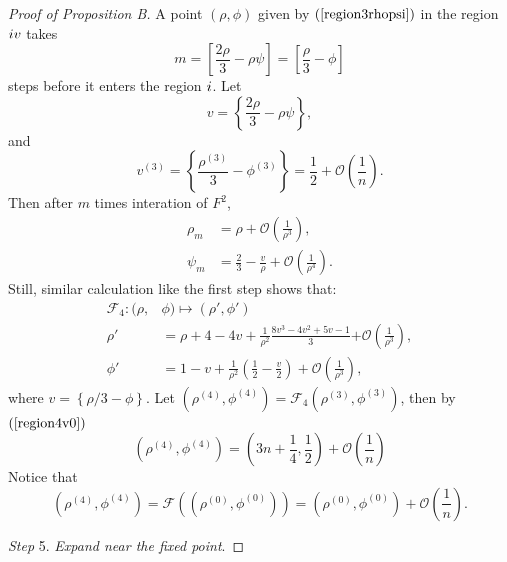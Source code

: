 \documentclass{article}
\def \Rone{\uppercase\expandafter{\romannumeral1}}
\def \Rfour{\uppercase\expandafter{\romannumeral4}}
\numberwithin{figure}{section}
\numberwithin{equation}{section}
\theoremstyle{remark}
\theoremstyle{definition}
\begin{document}
\begin{proof}[Proof of Proposition B]
       A point $(\rho,\phi)$ given by $(\ref{region3rhopsi})$ in the region $\Rfour$ takes 
       $$m=\left[\frac{2\rho}{3}-\rho\psi\right]=\left[\frac{\rho}{3}-\phi\right]$$
       steps before it enters the region $\Rone$. Let
       $$v=\left\{\frac{2\rho}{3}-\rho\psi\right\},$$
    and
    \begin{equation}\label{region4v0}
         v^{(3)}=\left\{\frac{\rho^{(3)}}{3}-\phi^{(3)}\right\}=\frac{1}{2}+\mathcal{O}\left(\frac{1}{n}\right).
    \end{equation}
    Then after $m$ times interation of $F^2$,
       \begin{equation}\label{cross4}
		\begin{split}
			\rho_{m} &= \rho + \mathcal{O}\left( \frac{1}{\rho^{3}} \right),\\
			\psi_{m} &= \frac{2}{3} - \frac{v}{\rho} + \mathcal{O}\left( \frac{1}{\rho^{4}} \right).
		\end{split}
	\end{equation}
       Still, similar calculation like the first step shows that:
       \begin{equation}\label{F4}
		\begin{split}
        \mathcal{F}_4:(\rho,&\phi)\mapsto(\rho',\phi')\\
			\rho' &= \rho +4-4v+ \frac{1}{\rho^{2}}\frac{8v^3-4v^2+5v-1}{3}\mathcal{+ O}\left( \frac{1}{\rho^{3}} \right),\\
			\phi'& =1 - v+ \frac{1}{\rho^{2}}\left(\frac{1}{2}-\frac{v}{2}\right) + \mathcal{O}\left( \frac{1}{\rho^{3}} \right),
		\end{split}
	\end{equation}
       where $v=\left\{\rho/3-\phi\right\}$.
     Let $(\rho^{(4)},\phi^{(4)})=\mathcal{F}_4(\rho^{(3)},\phi^{(3)})$, then by $(\ref{region4v0})$
       \begin{equation}\label{fixpoint 4}
           (\rho^{(4)},\phi^{(4)})=\left(3n+\frac{1}{4},\frac{1}{2}\right)+\mathcal{O}\left(\frac{1}{n}\right)
       \end{equation}
    Notice that
    \begin{equation}
        (\rho^{(4)},\phi^{(4)})=\mathcal{F}((\rho^{(0)},\phi^{(0)}))=(\rho^{(0)},\phi^{(0)})+\mathcal{O}\left(\frac{1}{n}\right).
    \end{equation}

\emph{Step} 5. \emph{Expand near the fixed point}.
   

\end{proof}
\end{document}
